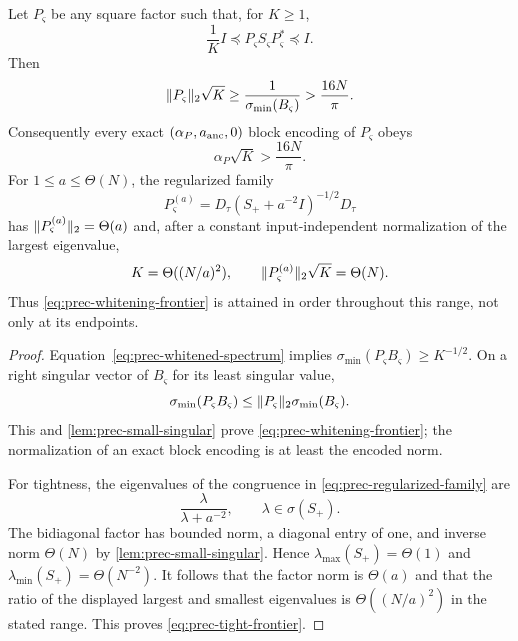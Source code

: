 \begin{theorem}
\label{thm:prec-whitening-frontier}
Let $P_\varsigma$ be any square factor such that, for $K\geq1$,
\begin{equation}
 \frac1K I\preceq P_\varsigma S_\varsigma P_\varsigma^*
 \preceq I.                                      \label{eq:prec-whitened-spectrum}
\end{equation}
Then
\begin{equation}
 \lVert P_\varsigma\rVert_2\sqrt K
 \geq\frac1{\sigma_{\min}(B_\varsigma)}
 >\frac{16N}{\pi}.                              \label{eq:prec-whitening-frontier}
\end{equation}
Consequently every exact $(\alpha_P,a_{\rm anc},0)$ block encoding of $P_\varsigma$
obeys
\begin{equation}
 \boxed{\alpha_P\sqrt K>\frac{16N}{\pi}}.       \label{eq:prec-alpha-frontier}
\end{equation}
For $1\leq a\leq\Theta(N)$, the regularized family
\begin{equation}
 P_\varsigma^{(a)}
 =D_\tau(S_++a^{-2}I)^{-1/2}D_\tau             \label{eq:prec-regularized-family}
\end{equation}
has $\lVert P_\varsigma^{(a)}\rVert_2=\Theta(a)$ and, after a constant
input-independent normalization of the largest eigenvalue,
\begin{equation}
 K=\Theta((N/a)^2),\qquad
 \lVert P_\varsigma^{(a)}\rVert_2\sqrt K=\Theta(N).  \label{eq:prec-tight-frontier}
\end{equation}
Thus \eqref{eq:prec-whitening-frontier} is attained in order throughout this
range, not only at its endpoints.
\end{theorem}

\begin{proof}
Equation~\eqref{eq:prec-whitened-spectrum} implies
$\sigma_{\min}(P_\varsigma B_\varsigma)\geq K^{-1/2}$.  On a right
singular vector of $B_\varsigma$ for its least singular value,
\[
 \sigma_{\min}(P_\varsigma B_\varsigma)
 \leq\lVert P_\varsigma\rVert_2\sigma_{\min}(B_\varsigma).
\]
This and \cref{lem:prec-small-singular} prove
\eqref{eq:prec-whitening-frontier}; the normalization of an exact block
encoding is at least the encoded norm.

For tightness, the eigenvalues of the congruence in
\eqref{eq:prec-regularized-family} are
\[
 \frac{\lambda}{\lambda+a^{-2}},\qquad \lambda\in\sigma(S_+).
\]
The bidiagonal factor has bounded norm, a diagonal entry of one, and inverse
norm $\Theta(N)$ by \cref{lem:prec-small-singular}.  Hence
$\lambda_{\max}(S_+)=\Theta(1)$ and
$\lambda_{\min}(S_+)=\Theta(N^{-2})$.  It follows that the factor norm is
$\Theta(a)$ and that the ratio of the displayed largest and smallest
eigenvalues is $\Theta((N/a)^2)$ in the stated range.  This proves
\eqref{eq:prec-tight-frontier}.
\end{proof}

